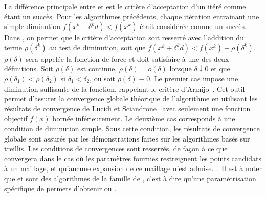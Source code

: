 La différence principale entre \GSS et \GPS est le critère d'acceptation d'un itéré comme étant un succès. Pour les algorithmes précédents, chaque itération entrainant une simple diminution $f(x^k+\delta^kd)<f(x^k)$ était considérée comme un succès. Dans \GSS, on permet que le critère d'acceptation soit resserré avec l'addition du terme $\rho(\delta^k)$ au test de diminution, soit que $f(x^k+\delta^kd)<f(x^k)+\rho(\delta^k)$. $\rho(\delta)$ sera appelée la fonction de force et doit satisfaire à une des deux définitions. Soit $\rho(\delta)$ est continue, $\rho(\delta) = o(\delta)$ lorsque $\delta \downarrow 0$ et que $\rho(\delta_1) < \rho(\delta_2)$ si $\delta_1 < \delta_2$, ou soit $\rho(\delta)\equiv0$. Le premier cas impose une diminution suffisante de la fonction, rappelant le critère d'Armijo~\cite{Armi66a,griva2009linear}. Cet outil permet d'assurer la convergence globale théorique de l'algorithme en utilisant les résultats de convergence de Lucidi et Sciandrone~\cite{SLucidi_MSciandrone_2002} avec seulement une fonction objectif $f(x)$ bornée inférieurement. Le deuxième cas corresponds à une condition de diminution simple. Sous cette condition, les résultats de convergence globale sont assurés par les démonstrations faites sur les algorithmes basés sur treillis. Les conditions de convergences sont resserrés, de façon à ce que \GSS convergera dans le cas où les paramètres fournies restreignent les points candidats à un maillage, et qu'aucune expansion de ce maillage n'est admise.~\cite{KoLeTo03a,CoPr01a}. Il est à noter que \CS et \GPS sont des algorithmes de la famille de \GSS, c'est à dire qu'une paramétrisation spécifique de \GSS permets d'obtenir \GPS ou \CS.  
  
